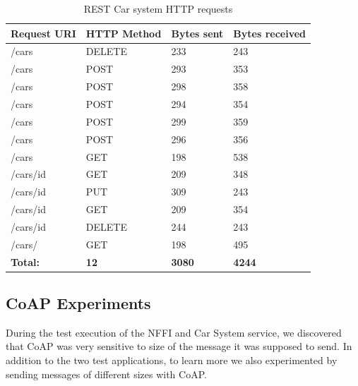 \begin{table}[h]
\begin{tabular}{|l|l|l|l|}
\hline
\textbf{Request URI} & \textbf{HTTP Method} & \textbf{Bytes sent} & \textbf{Bytes received} \\ \hline
/cars                   & DELETE                  & 233                 & 243           \\ \hline
/cars                   & POST                  & 293                 & 353           \\ \hline
/cars                    & POST                 & 298                 & 358           \\ \hline
/cars                    & POST                 & 294                 & 354           \\ \hline
/cars                    & POST                 & 299                 & 359           \\ \hline
/cars                    & POST                 & 296                 & 356           \\ \hline
/cars                    & GET                 & 198                 & 538           \\ \hline
/cars/{id}                    & GET                 & 209                 & 348           \\ \hline
/cars/{id}                    & PUT                 & 309                 & 243           \\ \hline
/cars/{id}                   & GET                 & 209                 & 354           \\ \hline
/cars/{id}                   & DELETE                 & 244                 & 243           \\ \hline
/cars/                   & GET                 & 198                 & 495           \\ \hline
\textbf{Total:}       & \textbf{12}               & \textbf{3080}                & \textbf{4244}          \\ \hline
\end{tabular}
\caption{REST Car system HTTP requests}
\label{table:car-requests}
\end{table}


\subsection{CoAP Experiments}

During the test execution of the NFFI and Car System service, we discovered that
CoAP was very sensitive to size of the message it was supposed to send. In
addition to the two test applications, to learn more we also experimented
by sending messages of different sizes with CoAP.

